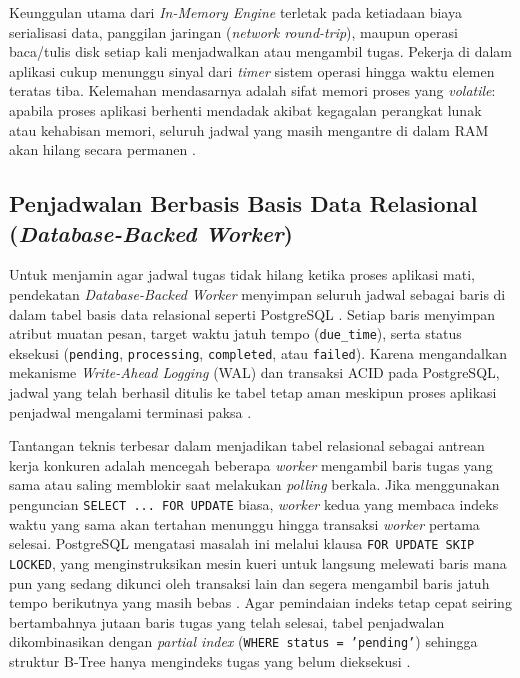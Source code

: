 Keunggulan utama dari \textit{In-Memory Engine} terletak pada ketiadaan biaya serialisasi data, panggilan jaringan (\textit{network round-trip}), maupun operasi baca/tulis disk setiap kali menjadwalkan atau mengambil tugas. Pekerja di dalam aplikasi cukup menunggu sinyal dari \textit{timer} sistem operasi hingga waktu elemen teratas tiba. Kelemahan mendasarnya adalah sifat memori proses yang \textit{volatile}: apabila proses aplikasi berhenti mendadak akibat kegagalan perangkat lunak atau kehabisan memori, seluruh jadwal yang masih mengantre di dalam RAM akan hilang secara permanen \cite{kleppmann2026designing}. \par

\subsection{Penjadwalan Berbasis Basis Data Relasional (\textit{Database-Backed Worker})} \label{II.Teori_RDBMS}
Untuk menjamin agar jadwal tugas tidak hilang ketika proses aplikasi mati, pendekatan \textit{Database-Backed Worker} menyimpan seluruh jadwal sebagai baris di dalam tabel basis data relasional seperti PostgreSQL \cite{skiadopoulos2022dbos}. Setiap baris menyimpan atribut muatan pesan, target waktu jatuh tempo (\texttt{due\_time}), serta status eksekusi (\texttt{pending}, \texttt{processing}, \texttt{completed}, atau \texttt{failed}). Karena mengandalkan mekanisme \textit{Write-Ahead Logging} (WAL) dan transaksi ACID pada PostgreSQL, jadwal yang telah berhasil ditulis ke tabel tetap aman meskipun proses aplikasi penjadwal mengalami terminasi paksa \cite{kleppmann2026designing}. \par

Tantangan teknis terbesar dalam menjadikan tabel relasional sebagai antrean kerja konkuren adalah mencegah beberapa \textit{worker} mengambil baris tugas yang sama atau saling memblokir saat melakukan \textit{polling} berkala. Jika menggunakan penguncian \texttt{SELECT ... FOR UPDATE} biasa, \textit{worker} kedua yang membaca indeks waktu yang sama akan tertahan menunggu hingga transaksi \textit{worker} pertama selesai. PostgreSQL mengatasi masalah ini melalui klausa \texttt{FOR UPDATE SKIP LOCKED}, yang menginstruksikan mesin kueri untuk langsung melewati baris mana pun yang sedang dikunci oleh transaksi lain dan segera mengambil baris jatuh tempo berikutnya yang masih bebas \cite{postgresql2025doc}. Agar pemindaian indeks tetap cepat seiring bertambahnya jutaan baris tugas yang telah selesai, tabel penjadwalan dikombinasikan dengan \textit{partial index} (\texttt{WHERE status = 'pending'}) sehingga struktur B-Tree hanya mengindeks tugas yang belum dieksekusi \cite{postgresql2025doc}. \par

